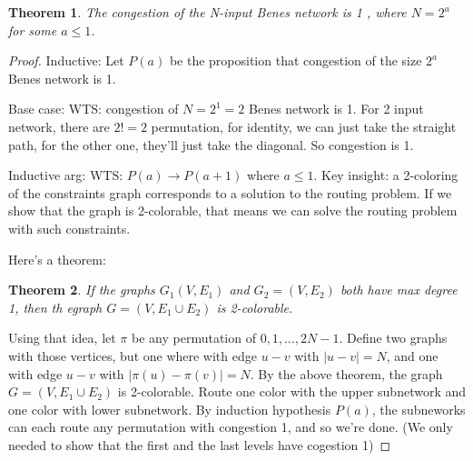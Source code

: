 \documentclass[10pt]{article}
\newcommand{\ra}{\rightarrow}
\newtheorem{theorem}{Theorem}[subsection]
\begin{document}
\begin{theorem}
  The congestion of the N-input Benes network is 1 , where $N=2^a$ for
  some $a\le 1$.
\end{theorem}
\begin{proof}
Inductive:  Let $P(a)$ be the proposition that congestion of the size $2^a$
  Benes network is 1.

Base case: WTS: congestion of $N=2^1 = 2$ Benes network is 1. For 2
input network, there are $2!=2$ permutation, for identity, we can just
take the straight path, for the other one, they'll just take the
diagonal. So congestion is 1.

Inductive arg: WTS: $P(a) \ra P(a+1)$ where $a\le 1$. Key insight: a
2-coloring of the constraints graph corresponds to a solution to the
routing problem. If we show that the graph is 2-colorable, that means
we can solve the routing problem with such constraints.

Here's a theorem:
\begin{theorem}
  If the graphs $G_1(V, E_1)$ and $G_2 = (V, E_2)$ both have max
  degree 1, then th egraph $G = (V, E_1\cup E_2)$ is \emph{2-colorable}.
\end{theorem}

Using that idea, let $\pi$ be any permutation of ${0, 1, \dots,
  2N-1}$. Define two graphs with those vertices, but one where with edge $u-v$ with $|u-v|=N$,
and one with edge $u-v$ with $|\pi(u)-\pi(v)| = N$. By the above
theorem, the graph $G=(V, E_1\cup E_2)$ is 2-colorable. Route one
color with the upper subnetwork and one color with lower
subnetwork. By induction hypothesis $P(a)$, the subneworks can each
route any permutation with congestion 1, and so we're done. (We only needed to show that
the first and the last levels have cogestion 1)
\end{proof}
\end{document}
